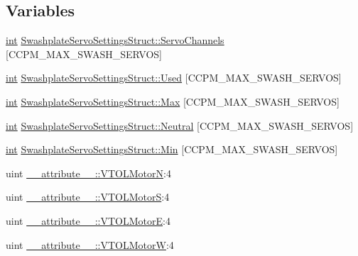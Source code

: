 \subsection*{Variables}
\begin{DoxyCompactItemize}
\item 
\hyperlink{ioapi_8h_a787fa3cf048117ba7123753c1e74fcd6}{int} \hyperlink{group___config_plugin_ga86e55bfb2e22af5cf453931b3990d504}{Swashplate\-Servo\-Settings\-Struct\-::\-Servo\-Channels} \mbox{[}C\-C\-P\-M\-\_\-\-M\-A\-X\-\_\-\-S\-W\-A\-S\-H\-\_\-\-S\-E\-R\-V\-O\-S\mbox{]}
\item 
\hyperlink{ioapi_8h_a787fa3cf048117ba7123753c1e74fcd6}{int} \hyperlink{group___config_plugin_ga9fda1ee21effccd7fcbad04816734eac}{Swashplate\-Servo\-Settings\-Struct\-::\-Used} \mbox{[}C\-C\-P\-M\-\_\-\-M\-A\-X\-\_\-\-S\-W\-A\-S\-H\-\_\-\-S\-E\-R\-V\-O\-S\mbox{]}
\item 
\hyperlink{ioapi_8h_a787fa3cf048117ba7123753c1e74fcd6}{int} \hyperlink{group___config_plugin_ga30259c7dfef707f2d0999fed8adaf6b1}{Swashplate\-Servo\-Settings\-Struct\-::\-Max} \mbox{[}C\-C\-P\-M\-\_\-\-M\-A\-X\-\_\-\-S\-W\-A\-S\-H\-\_\-\-S\-E\-R\-V\-O\-S\mbox{]}
\item 
\hyperlink{ioapi_8h_a787fa3cf048117ba7123753c1e74fcd6}{int} \hyperlink{group___config_plugin_gad228ac505087eafb0d00d4aab3b3e76d}{Swashplate\-Servo\-Settings\-Struct\-::\-Neutral} \mbox{[}C\-C\-P\-M\-\_\-\-M\-A\-X\-\_\-\-S\-W\-A\-S\-H\-\_\-\-S\-E\-R\-V\-O\-S\mbox{]}
\item 
\hyperlink{ioapi_8h_a787fa3cf048117ba7123753c1e74fcd6}{int} \hyperlink{group___config_plugin_ga68b64812e9062f2c280eebb8ad8961c4}{Swashplate\-Servo\-Settings\-Struct\-::\-Min} \mbox{[}C\-C\-P\-M\-\_\-\-M\-A\-X\-\_\-\-S\-W\-A\-S\-H\-\_\-\-S\-E\-R\-V\-O\-S\mbox{]}
\item 
uint \hyperlink{group___config_plugin_ga2f7517413dcc58e5033f5b558c2645b6}{\-\_\-\-\_\-attribute\-\_\-\-\_\-\-::\-V\-T\-O\-L\-Motor\-N}\-:4
\item 
uint \hyperlink{group___config_plugin_ga454ee04b612bfb51636328cac0ecb30c}{\-\_\-\-\_\-attribute\-\_\-\-\_\-\-::\-V\-T\-O\-L\-Motor\-S}\-:4
\item 
uint \hyperlink{group___config_plugin_ga98abc446e1dcba498787f381659f6b2d}{\-\_\-\-\_\-attribute\-\_\-\-\_\-\-::\-V\-T\-O\-L\-Motor\-E}\-:4
\item 
uint \hyperlink{group___config_plugin_ga702b69e8ffd06d1a761e28540e0706c0}{\-\_\-\-\_\-attribute\-\_\-\-\_\-\-::\-V\-T\-O\-L\-Motor\-W}\-:4
\item 

\end{DoxyCompactItemize}
